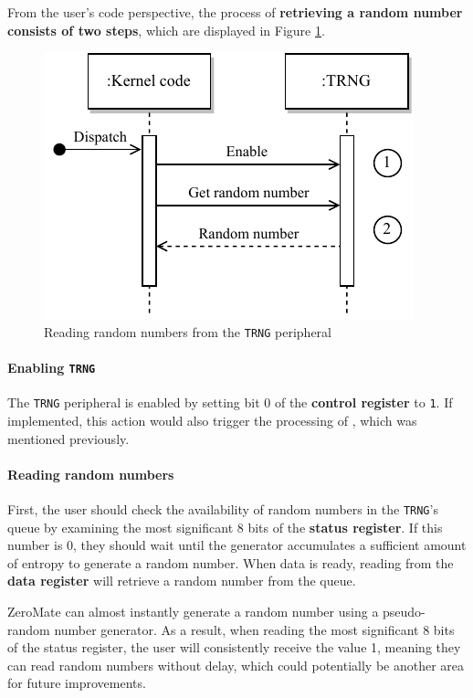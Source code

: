 \documentclass[english, ing, kiv, he, iso690numb, pdf]{fasthesis}
\begin{document}
	From the user's code perspective, the process of \textbf{retrieving a random number consists of two steps}, which are displayed in Figure \ref{Reading random numbers using the TRNG peripheral}.
	
	\begin{figure}[ht]
		\centering
		\includegraphics[width=.6\textwidth]{img/diagrams/trng.pdf}
		\caption{Reading random numbers from the \texttt{TRNG} peripheral}
		\label{Reading random numbers using the TRNG peripheral}
	\end{figure}
	
	\newpage
	
	\paragraph{Enabling \texttt{TRNG}}
	
	The \texttt{TRNG} peripheral is enabled by setting bit 0 of the \textbf{control register} to \texttt{1}. If implemented, this action would also trigger the processing of , which was mentioned previously.
	
	\paragraph{Reading random numbers}
	
	First, the user should check the availability of random numbers in the \texttt{TRNG}'s queue by examining the most significant 8 bits of the \textbf{status register}. If this number is 0, they should wait until the generator accumulates a sufficient amount of entropy to generate a random number. When data is ready, reading from the \textbf{data register} will retrieve a random number from the queue.
	
	\begin{important}
		ZeroMate can almost instantly generate a random number using a pseudo-random number generator. As a result, when reading the most significant 8 bits of the status register, the user will consistently receive the value 1, meaning they can read random numbers without delay, which could potentially be another area for future improvements.
	\end{important}
	
\end{document}

